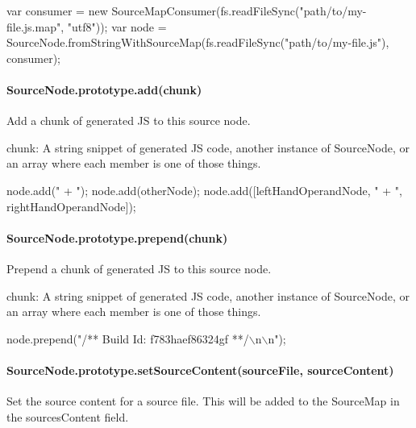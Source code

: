 \begin{DoxyCode}
var consumer = new SourceMapConsumer(fs.readFileSync("path/to/my-file.js.map", "utf8"));
var node = SourceNode.fromStringWithSourceMap(fs.readFileSync("path/to/my-file.js"),
                                              consumer);
\end{DoxyCode}


\paragraph*{Source\+Node.\+prototype.\+add(chunk)}

Add a chunk of generated JS to this source node.


\begin{DoxyItemize}
\item {\ttfamily chunk}\+: A string snippet of generated JS code, another instance of {\ttfamily Source\+Node}, or an array where each member is one of those things.
\end{DoxyItemize}


\begin{DoxyCode}
node.add(" + ");
node.add(otherNode);
node.add([leftHandOperandNode, " + ", rightHandOperandNode]);
\end{DoxyCode}


\paragraph*{Source\+Node.\+prototype.\+prepend(chunk)}

Prepend a chunk of generated JS to this source node.


\begin{DoxyItemize}
\item {\ttfamily chunk}\+: A string snippet of generated JS code, another instance of {\ttfamily Source\+Node}, or an array where each member is one of those things.
\end{DoxyItemize}


\begin{DoxyCode}
node.prepend("/** Build Id: f783haef86324gf **/\(\backslash\)n\(\backslash\)n");
\end{DoxyCode}


\paragraph*{Source\+Node.\+prototype.\+set\+Source\+Content(source\+File, source\+Content)}

Set the source content for a source file. This will be added to the {\ttfamily Source\+Map} in the {\ttfamily sources\+Content} field.


